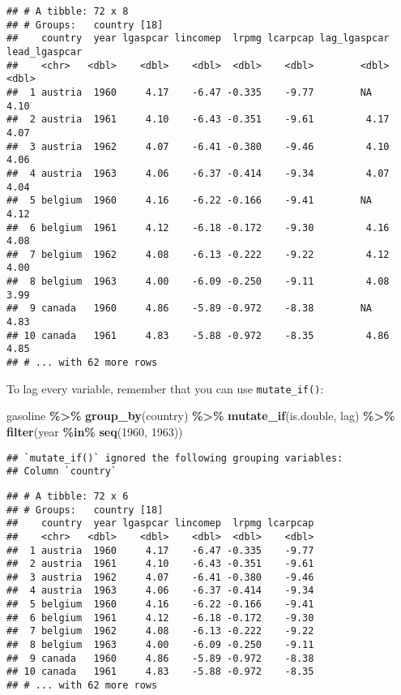 \documentclass[
]{article}
\newenvironment{Shaded}{\begin{snugshade}}{\end{snugshade}}
\newcommand{\DecValTok}[1]{\textcolor[rgb]{0.00,0.00,0.81}{#1}}
\newcommand{\KeywordTok}[1]{\textcolor[rgb]{0.13,0.29,0.53}{\textbf{#1}}}
\newcommand{\NormalTok}[1]{#1}
\newcommand{\OperatorTok}[1]{\textcolor[rgb]{0.81,0.36,0.00}{\textbf{#1}}}
\newcommand{\StringTok}[1]{\textcolor[rgb]{0.31,0.60,0.02}{#1}}
\begin{document}
\begin{verbatim}
## # A tibble: 72 x 8
## # Groups:   country [18]
##    country  year lgaspcar lincomep  lrpmg lcarpcap lag_lgaspcar lead_lgaspcar
##    <chr>   <dbl>    <dbl>    <dbl>  <dbl>    <dbl>        <dbl>         <dbl>
##  1 austria  1960     4.17    -6.47 -0.335    -9.77        NA             4.10
##  2 austria  1961     4.10    -6.43 -0.351    -9.61         4.17          4.07
##  3 austria  1962     4.07    -6.41 -0.380    -9.46         4.10          4.06
##  4 austria  1963     4.06    -6.37 -0.414    -9.34         4.07          4.04
##  5 belgium  1960     4.16    -6.22 -0.166    -9.41        NA             4.12
##  6 belgium  1961     4.12    -6.18 -0.172    -9.30         4.16          4.08
##  7 belgium  1962     4.08    -6.13 -0.222    -9.22         4.12          4.00
##  8 belgium  1963     4.00    -6.09 -0.250    -9.11         4.08          3.99
##  9 canada   1960     4.86    -5.89 -0.972    -8.38        NA             4.83
## 10 canada   1961     4.83    -5.88 -0.972    -8.35         4.86          4.85
## # ... with 62 more rows
\end{verbatim}

To lag every variable, remember that you can use \texttt{mutate\_if()}:

\begin{Shaded}
\begin{Highlighting}[]
\NormalTok{gasoline }\OperatorTok{\%\textgreater{}\%}
\StringTok{  }\KeywordTok{group\_by}\NormalTok{(country) }\OperatorTok{\%\textgreater{}\%}
\StringTok{  }\KeywordTok{mutate\_if}\NormalTok{(is.double, lag) }\OperatorTok{\%\textgreater{}\%}
\StringTok{  }\KeywordTok{filter}\NormalTok{(year }\OperatorTok{\%in\%}\StringTok{ }\KeywordTok{seq}\NormalTok{(}\DecValTok{1960}\NormalTok{, }\DecValTok{1963}\NormalTok{))}
\end{Highlighting}
\end{Shaded}

\begin{verbatim}
## `mutate_if()` ignored the following grouping variables:
## Column `country`
\end{verbatim}

\begin{verbatim}
## # A tibble: 72 x 6
## # Groups:   country [18]
##    country  year lgaspcar lincomep  lrpmg lcarpcap
##    <chr>   <dbl>    <dbl>    <dbl>  <dbl>    <dbl>
##  1 austria  1960     4.17    -6.47 -0.335    -9.77
##  2 austria  1961     4.10    -6.43 -0.351    -9.61
##  3 austria  1962     4.07    -6.41 -0.380    -9.46
##  4 austria  1963     4.06    -6.37 -0.414    -9.34
##  5 belgium  1960     4.16    -6.22 -0.166    -9.41
##  6 belgium  1961     4.12    -6.18 -0.172    -9.30
##  7 belgium  1962     4.08    -6.13 -0.222    -9.22
##  8 belgium  1963     4.00    -6.09 -0.250    -9.11
##  9 canada   1960     4.86    -5.89 -0.972    -8.38
## 10 canada   1961     4.83    -5.88 -0.972    -8.35
## # ... with 62 more rows
\end{verbatim}
\end{document}
